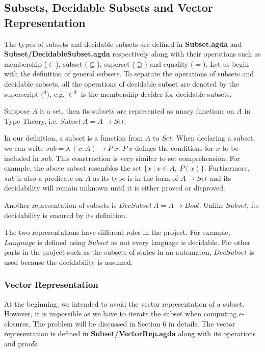 \subsection{Subsets, Decidable Subsets and Vector Representation}
\par The types of subsets and decidable subsets are defined in
\textbf{Subset.agda} and \textbf{Subset/DecidableSubset.agda}
respectively along with their operations such as membership (\(\in\)), subset
(\(\subseteq\)), superset (\(\supseteq\)) and equality (\(=\)). Let us
begin with the definition of general subsets. To separate the
operations of subsets and decidable subsets, all the operations of
decidable subset are denoted by the superscript (\(^d\)), e.g. \(\in^d\)
is the membership decider for decidable subsets. 

\begin{defn} 
\noindent Suppose \(A\) is a set, then its
subsets are represented as unary functions on
\(A\) in Type Theory, i.e. \(Subset\ A = A \to Set\). 
\end{defn}

\par In our definition, a subset is a function from \(A\) to
\(Set\). When declaring a subset, we can write \(sub =
\lambda\ (x : A) \to P\ x\). \(P\ x\) defines the conditions for \(x\) to
be included in \(sub\). This construction is
very similar to set comprehension. For example, the above subset
resembles the set \(\{x\ | \ x \in A,\ P(x)\}\). Furthermore, \(sub\) is
also a predicate on \(A\) as its type is in the form of \(A \to
Set\) and its decidability will remain unknown until it is either proved or disproved. 

\begin{defn} 
\noindent Another representation of subsets is \(DecSubset\ A = A \to
Bool\). Unlike \(Subset\), its decidability is ensured by its
definition. 
\end{defn}

\par The two representations have different roles in the project. For
example, \(Language\) is defined using \(Subset\) as not every
language is decidable. For other parts in the project 
such as the subsets of states in an automaton, \(DecSubset\) is used
because the decidability is assumed. 


\subsubsection{Vector Representation}
\par At the beginning, we intended to avoid the vector representation of a
subset. However, it is impossible as we have to iterate the subset
when computing \(\epsilon\)-closures. The problem will be discussed in
Section 6 in details. The vector representation is defined in
\textbf{Subset/VectorRep.agda} along with its operations and proofs. 


